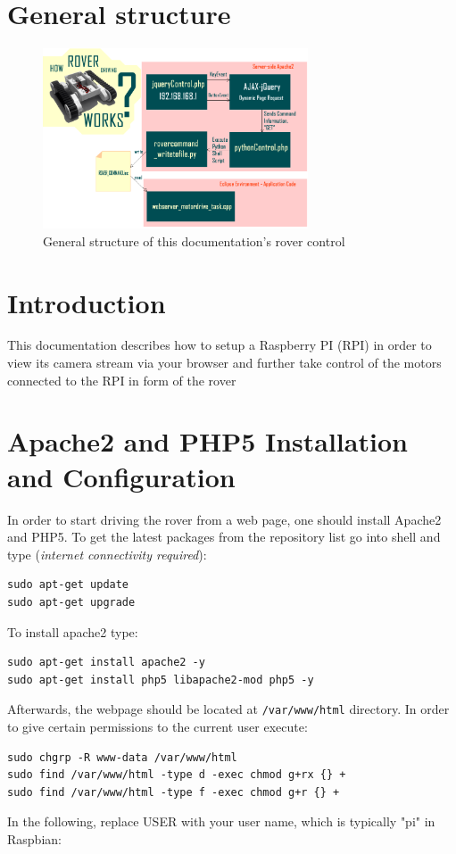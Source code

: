 \section{General structure}
\begin{figure}[h!]
\centering
\includegraphics[width=0.7\textwidth]{structure.png}
\caption{General structure of this documentation's rover control}
\label{fig:struct}
\end{figure}

\section{Introduction}
This documentation describes how to setup a Raspberry PI (RPI) in order to view its camera stream via your browser and further take control of the motors connected to the RPI in form of the rover %

\section{Apache2 and PHP5 Installation and Configuration}
	In order to start driving the rover from a web page, one should install Apache2 and PHP5. To get the latest packages from the repository list go into shell and type (\textit{internet connectivity required}):
\begin{lstlisting}
sudo apt-get update
sudo apt-get upgrade
\end{lstlisting}
To install apache2 type:
\begin{lstlisting}
sudo apt-get install apache2 -y
sudo apt-get install php5 libapache2-mod php5 -y
\end{lstlisting}
Afterwards, the webpage should be located at \texttt{/var/www/html} directory. In order to give certain permissions to the current user execute: 
\begin{lstlisting}
sudo chgrp -R www-data /var/www/html
sudo find /var/www/html -type d -exec chmod g+rx {} +
sudo find /var/www/html -type f -exec chmod g+r {} +
\end{lstlisting}
In the following, replace USER with your user name, which is typically "pi" in Raspbian:

